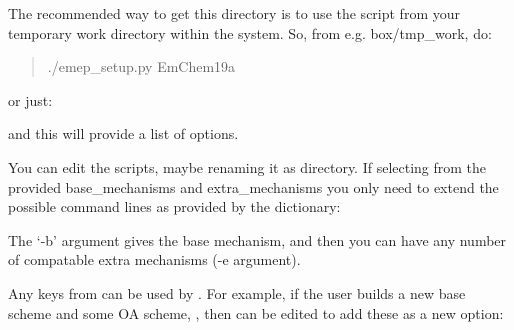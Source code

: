 \documentclass[a4paper,10pt,english]{sphinxmanual}
\begin{document}
The recommended way to get this directory is to use the script  from your temporary work directory
within  the  system. So, from e.g. box/tmp\_work, do:
\begin{quote}

./emep\_setup.py  EmChem19a
\end{quote}

or just:

\begin{sphinxVerbatim}[commandchars=\\\{\}]
\end{sphinxVerbatim}

and this will provide a list of options.

You can edit the  scripts, maybe renaming it as  directory.
If selecting from the provided base\_mechanisms and extra\_mechanisms you only need to extend
the possible command lines as provided by the   dictionary:

\begin{sphinxVerbatim}[commandchars=\\\{\}]
\PYG{p}{[}\PYG{p}{]} 
\PYG{p}{[}\PYG{p}{]} 
\end{sphinxVerbatim}

The ‘-b’ argument gives the base mechanism, and then you can have any number of compatable extra mechanisms (-e argument).

Any keys from  can be used by . For example, if the user builds a new base scheme  and
some OA scheme, , then  can be edited to add these as a new option:

\begin{sphinxVerbatim}[commandchars=\\\{\}]
\PYG{p}{[}\PYG{p}{]} 
\end{sphinxVerbatim}
\end{document}
